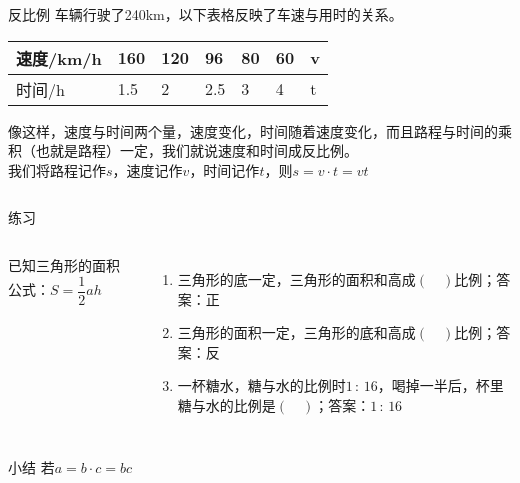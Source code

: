 \documentclass[aspectratio=169]{ctexbeamer} %
\begin{document}
\begin{frame}[t]{反比例}
车辆行驶了240km，以下表格反映了车速与用时的关系。
\begin{center}
\begin{tabular}{| l | l | l | l | l | l | l |}
    \hline
    速度/km/h & 160 & 120 & 96 & 80 & 60 & v \\
    \hline
    时间/h & 1.5 & 2 & 2.5 & 3 & 4 & t \\
    \hline
\end{tabular} 
\end{center}
像这样，速度与时间两个量，速度变化，时间随着速度变化，而且路程与时间的乘积（也就是路程）一定，我们就说速度和时间成\alert{反比例}。\\
我们将路程记作$s$，速度记作$v$，时间记作$t$，则$s = v \cdot t = vt$
\begin{columns}


\end{columns}
\end{frame}

\begin{frame}[t]{练习}
\begin{columns}
已知三角形的面积公式：$S = \dfrac{1}{2} ah$
\begin{enumerate}[label={\arabic*.}]
\item 三角形的底一定，三角形的面积和高成$(\quad)$比例；\pause \alert{答案：正}
\item 三角形的面积一定，三角形的底和高成$(\quad)$比例；\pause \alert{答案：反}
\item 一杯糖水，糖与水的比例时$1 \, : \, 16$，喝掉一半后，杯里糖与水的比例是$(\quad)$；\pause \alert{答案：$1 \, : \, 16$}
\end{enumerate}
\end{columns}
\end{frame}

\begin{frame}[t]{小结}
若$a = b \cdot c = bc$
\begin{columns}
\end{columns}
\end{frame}
\end{document}
